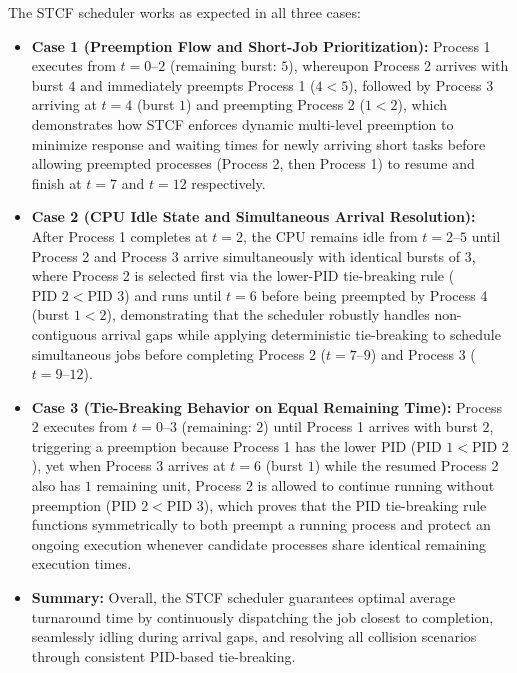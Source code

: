 \documentclass[11pt,a4paper]{article}
\begin{document}
The STCF scheduler works as expected in all three cases:
\begin{itemize}[leftmargin=2em]
  \item \textbf{Case 1 (Preemption Flow and Short-Job Prioritization):} Process 1 executes from $t = 0\text{--}2$ (remaining burst: $5$), whereupon Process 2 arrives with burst $4$ and immediately preempts Process 1 ($4 < 5$), followed by Process 3 arriving at $t = 4$ (burst $1$) and preempting Process 2 ($1 < 2$), which demonstrates how STCF enforces dynamic multi-level preemption to minimize response and waiting times for newly arriving short tasks before allowing preempted processes (Process 2, then Process 1) to resume and finish at $t = 7$ and $t = 12$ respectively.
  \item \textbf{Case 2 (CPU Idle State and Simultaneous Arrival Resolution):} After Process 1 completes at $t = 2$, the CPU remains idle from $t = 2\text{--}5$ until Process 2 and Process 3 arrive simultaneously with identical bursts of $3$, where Process 2 is selected first via the lower-PID tie-breaking rule ($\text{PID } 2 < \text{PID } 3$) and runs until $t = 6$ before being preempted by Process 4 (burst $1 < 2$), demonstrating that the scheduler robustly handles non-contiguous arrival gaps while applying deterministic tie-breaking to schedule simultaneous jobs before completing Process 2 ($t = 7\text{--}9$) and Process 3 ($t = 9\text{--}12$).
  \item \textbf{Case 3 (Tie-Breaking Behavior on Equal Remaining Time):} Process 2 executes from $t = 0\text{--}3$ (remaining: $2$) until Process 1 arrives with burst $2$, triggering a preemption because Process 1 has the lower PID ($\text{PID } 1 < \text{PID } 2$), yet when Process 3 arrives at $t = 6$ (burst $1$) while the resumed Process 2 also has $1$ remaining unit, Process 2 is allowed to continue running without preemption ($\text{PID } 2 < \text{PID } 3$), which proves that the PID tie-breaking rule functions symmetrically to both preempt a running process and protect an ongoing execution whenever candidate processes share identical remaining execution times.
  \item \textbf{Summary:} Overall, the STCF scheduler guarantees optimal average turnaround time by continuously dispatching the job closest to completion, seamlessly idling during arrival gaps, and resolving all collision scenarios through consistent PID-based tie-breaking.
\end{itemize}
\end{document}
